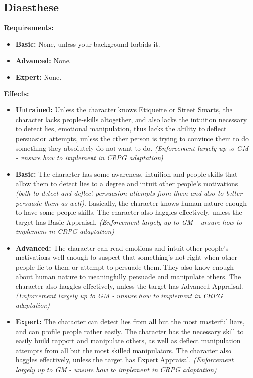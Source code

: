 \subsection{Diaesthese}
\begin{table}[!ht]
\centering
{}
\end{table}
\textbf{Requirements:}
\begin{itemize}
	\item \textbf{Basic:} None, unless your background forbids it.
	\item \textbf{Advanced:} None.
	\item \textbf{Expert:} None.
\end{itemize}
\textbf{Effects:}
\begin{itemize}
	\item \textbf{Untrained:} Unless the character knows Etiquette or Street Smarts, the character lacks people-skills altogether, and also lacks the intuition necessary to detect lies, emotional manipulation, thus lacks the ability to deflect persuasion attempts, unless the other person is trying to convince them to do something they absolutely do not want to do. \textit{(Enforcement largely up to GM - unsure how to implement in CRPG adaptation)}
	\item \textbf{Basic:} The character has some awareness, intuition and people-skills that allow them to detect lies to a degree and intuit other people's motivations \textit{(both to detect and deflect persuasion attempts from them and also to better persuade them as well)}. Basically, the character knows human nature enough to have some people-skills. The character also haggles effectively, unless the target has Basic Appraisal. \textit{(Enforcement largely up to GM - unsure how to implement in CRPG adaptation)}
	\item \textbf{Advanced:} The character can read emotions and intuit other people's motivations well enough to suspect that something's not right when other people lie to them or attempt to persuade them. They also know enough about human nature to meaningfully persuade and manipulate others. The character also haggles effectively, unless the target has Advanced Appraisal. \textit{(Enforcement largely up to GM - unsure how to implement in CRPG adaptation)}
	\item \textbf{Expert:} The character can detect lies from all but the most masterful liars, and can profile people rather easily. The character has the necessary skill to easily build rapport and manipulate others, as well as deflect manipulation attempts from all but the most skilled manipulators. The character also haggles effectively, unless the target has Expert Appraisal. \textit{(Enforcement largely up to GM - unsure how to implement in CRPG adaptation)}
\end{itemize}\newpage
